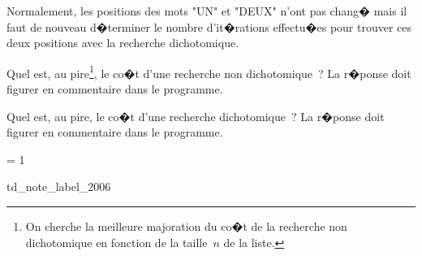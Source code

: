 \begin{xexercicenot}
\exequest Normalement, les positions des mots "UN" et "DEUX" n'ont pas chang� mais il faut de nouveau d�terminer le nombre d'it�rations effectu�es pour trouver ces deux positions avec la recherche dichotomique.

\exequest Quel est, au pire\footnote{On cherche la meilleure majoration du co�t de la recherche non dichotomique en fonction de la taille~$n$ de la liste.}, le co�t d'une recherche non dichotomique~? La r�ponse doit figurer en commentaire dans le programme.

\exequest Quel est, au pire, le co�t d'une recherche dichotomique~? La r�ponse doit figurer en commentaire dans le programme.





\end{xexercicenot}

\ifnum\correctionenonce = 1

\begin{xdemoexonot}{td_note_label_2006}

\bigskip
{}

\end{xdemoexonot}
\fi






%
